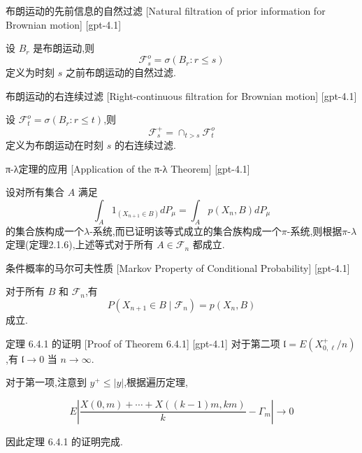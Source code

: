 \documentclass[UTF8]{ctexart}
\begin{document}
    
    
    \begin{dfn}
        {布朗运动的先前信息的自然过滤}
        [Natural filtration of prior information for Brownian motion]
        [gpt-4.1]
        
设 $B_r$ 是布朗运动,则
\[
\mathcal{F}_s^o = \sigma(B_r : r \le s)
\]
定义为时刻 $s$ 之前布朗运动的自然过滤.

    \end{dfn}
    
    
    
    \begin{dfn}
        {布朗运动的右连续过滤}
        [Right-continuous filtration for Brownian motion]
        [gpt-4.1]
        
设 $\mathcal{F}_t^o = \sigma(B_r : r \le t)$,则
\[
\mathcal{F}_s^+ = \cap_{t > s} \mathcal{F}_t^o
\]
定义为布朗运动在时刻 $s$ 的右连续过滤.

    \end{dfn}
    
    
    
    \begin{thm}
        {π-λ定理的应用}
        [Application of the π-λ Theorem]
        [gpt-4.1]
        
设对所有集合 $A$ 满足
\[
\int_A 1_{(X_{n+1} \in B)} dP_\mu = \int_A p(X_n, B) dP_\mu
\]
的集合族构成一个$\lambda$-系统,而已证明该等式成立的集合族构成一个$\pi$-系统,则根据$\pi$-$\lambda$定理(定理2.1.6),上述等式对于所有 $A \in \mathcal{F}_n$ 都成立.

    \end{thm}
    
    
    
    \begin{thm}
        {条件概率的马尔可夫性质}
        [Markov Property of Conditional Probability]
        [gpt-4.1]
        
对于所有 $B$ 和 $\mathcal{F}_n$,有
\[
P(X_{n+1} \in B \mid \mathcal{F}_n) = p(X_n, B)
\]
成立.

    \end{thm}
    
    
    
    \begin{thm}
        {定理 6.4.1 的证明}
        [Proof of Theorem 6.4.1]
        [gpt-4.1]
        对于第二项 $\mathfrak{l} = E ( X_{0,\ell}^{+} / n )$,有 $\mathfrak{l} \to 0$ 当 $n \to \infty$.

对于第一项,注意到 $y^{+} \leq |y|$,根据遍历定理,

\[
E \left| \frac{ X(0, m) + \cdots + X((k-1)m, km) }{ k } - \Gamma_{m} \right| \to 0
\]

因此定理 6.4.1 的证明完成.

    \end{thm}
    
\end{document}

